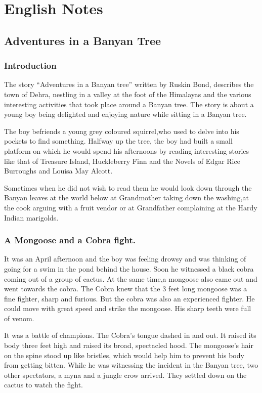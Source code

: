 \documentclass[a4paper,12pt]{book}
\date{\today}  %
\title{}  %
\date{\textit{<2024-08-26 Mon>}}
\title{}
\begin{document}
\tableofcontents


\part{English Notes}
\label{sec:org9e5c822}
\chapter{Adventures in a Banyan Tree}
\label{sec:org8bf7bdb}
\section{Introduction}
\label{sec:orgb834365}

The story “Adventures in a Banyan tree” written by Ruskin Bond, describes the town of Dehra, nestling in a valley at the foot of the Himalayas and the various interesting activities that took place around a Banyan tree. The story is about a young boy being delighted and enjoying nature while sitting in a Banyan tree.

The boy befriends a young grey coloured squirrel,who used to delve into his pockets to find something. Halfway up the tree, the boy had built a small platform on which he would spend his afternoons by reading interesting stories like that of Treasure Island, Huckleberry Finn and the Novels of Edgar Rice Burroughs and Louisa May Alcott.

Sometimes when he did not wish to read them he would look down through the Banyan leaves at the world below at Grandmother taking down the washing,at the cook arguing with a fruit vendor or at Grandfather complaining at the Hardy Indian marigolds.

\section{A Mongoose and a Cobra fight.}
\label{sec:org7d59c15}

It was an April afternoon and the boy was feeling drowsy and was thinking of going for a swim in the pond behind the house. Soon he witnessed a black cobra coming out of a group of cactus. At the same time,a mongoose also came out and went towards the cobra. The Cobra knew that the 3 feet long mongoose was a fine fighter, sharp and furious. But the cobra was also an experienced fighter. He could move with great speed and strike the mongoose. His sharp teeth were full of venom.

It was a battle of champions. The Cobra’s tongue dashed in and out. It raised its body three feet high and raised its broad, spectacled hood. The mongoose’s hair on the spine stood up like bristles, which would help him to prevent his body from getting bitten. While he was witnessing the incident in the Banyan tree, two other spectators, a myna and a jungle crow arrived. They settled down on the cactus to watch the fight.
\end{document}
